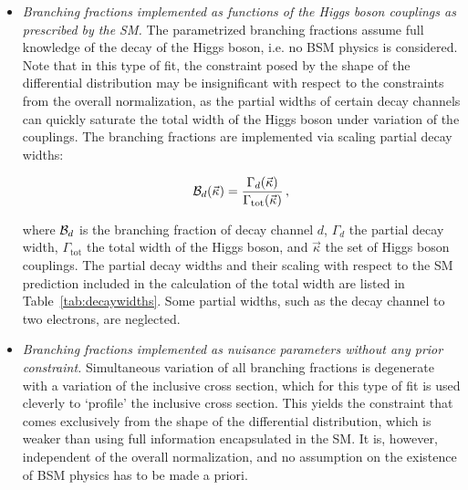 \begin{itemize}
\item
    \emph{Branching fractions implemented as functions of the Higgs boson couplings as prescribed by the SM.}
    The parametrized branching fractions assume full knowledge of the decay of the Higgs boson, i.e. no BSM physics is considered.
    Note that in this type of fit, the constraint posed by the shape of the differential distribution may be insignificant with respect to the constraints from the overall normalization, as the partial widths of certain decay channels can quickly saturate the total width of the Higgs boson under variation of the couplings.
    The branching fractions are implemented via scaling partial decay widths:
    \begin{linenomath*}
    \begin{equation}
    \mathcal{B}_d (\vec{\kappa}) = 
        \frac{
        \Gamma_d(\vec{\kappa})
        }{
        \Gamma_\text{tot}(\vec{\kappa})
        }
    \,,
    \end{equation}
    \end{linenomath*}
    where $\mathcal{B}_d$ is the branching fraction of decay channel $d$, $\Gamma_d$ the partial decay width, $\Gamma_\text{tot}$ the total width of the Higgs boson, and $\vec{\kappa}$ the set of Higgs boson couplings.
    The partial decay widths and their scaling with respect to the SM prediction included in the calculation of the total width are listed in Table~\ref{tab:decaywidths}.
    Some partial widths, such as the decay channel to two electrons, are neglected.
% 
\item
    \emph{Branching fractions implemented as nuisance parameters without any prior constraint.}
    Simultaneous variation of all branching fractions is degenerate with a variation of the inclusive cross section, which for this type of fit is used cleverly to `profile' the inclusive cross section.
    This yields the constraint that comes exclusively from the shape of the differential distribution, which is weaker than using full information encapsulated in the SM.
    It is, however, independent of the overall normalization, and no assumption on the existence of BSM physics has to be made a priori.
\end{itemize}


